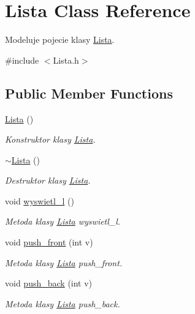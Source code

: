 \hypertarget{class_lista}{\section{Lista Class Reference}
\label{class_lista}
}


Modeluje pojecie klasy \hyperlink{class_lista}{Lista}.  




{\ttfamily \#include $<$Lista.\-h$>$}

\subsection*{Public Member Functions}
\begin{DoxyCompactItemize}
\item 
\hyperlink{class_lista_a1f668b36909182ef1360b48503529a31}{Lista} ()
\begin{DoxyCompactList}\small\item\em Konstruktor klasy \hyperlink{class_lista}{Lista}. \end{DoxyCompactList}\item 
\hyperlink{class_lista_a4d7394b2728a00ad8404965b2e15d096}{$\sim$\-Lista} ()
\begin{DoxyCompactList}\small\item\em Destruktor klasy \hyperlink{class_lista}{Lista}. \end{DoxyCompactList}\item 
void \hyperlink{class_lista_af9dfedaf314b64d618856767f1e868b3}{wyswietl\-\_\-l} ()
\begin{DoxyCompactList}\small\item\em Metoda klasy \hyperlink{class_lista}{Lista} wyswietl\-\_\-l. \end{DoxyCompactList}\item 
void \hyperlink{class_lista_a90fabf6bb8bc0fd4fcfde65ef48dc13e}{push\-\_\-front} (int v)
\begin{DoxyCompactList}\small\item\em Metoda klasy \hyperlink{class_lista}{Lista} push\-\_\-front. \end{DoxyCompactList}\item 
void \hyperlink{class_lista_a02bbc49487590c1ef1959fa3d667e90d}{push\-\_\-back} (int v)
\begin{DoxyCompactList}\small\item\em Metoda klasy \hyperlink{class_lista}{Lista} push\-\_\-back. \end{DoxyCompactList}\item 

\end{DoxyCompactItemize}
